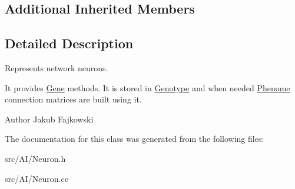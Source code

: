 \subsection*{Additional Inherited Members}


\subsection{Detailed Description}
Represents network neurons. 

It provides \hyperlink{classGene}{Gene} methods. It is stored in \hyperlink{classGenotype}{Genotype} and when needed \hyperlink{classPhenome}{Phenome} connection matrices are built using it. \begin{DoxyAuthor}{Author}
Jakub Fajkowski 
\end{DoxyAuthor}


The documentation for this class was generated from the following files\+:\begin{DoxyCompactItemize}
\item 
src/\+A\+I/Neuron.\+h\item 
src/\+A\+I/Neuron.\+cc\end{DoxyCompactItemize}

